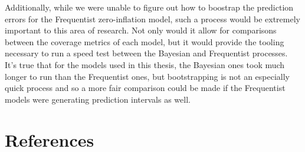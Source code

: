 \documentclass[12pt,twoside]{reedthesis}
\begin{document}
Additionally, while we were unable to figure out how to boostrap the prediction errors for the Frequentist zero-inflation model, such a process would be extremely important to this area of research. Not only would it allow for comparisons between the coverage metrics of each model, but it would provide the tooling necessary to run a speed test between the Bayesian and Frequentist processes. It's true that for the models used in this thesis, the Bayesian ones took much longer to run than the Frequentist ones, but bootstrapping is not an especially quick process and so a more fair comparison could be made if the Frequentist models were generating prediction intervals as well.

\backmatter

\hypertarget{references}{%
\chapter*{References}\label{references}}


\noindent

\setlength{\parindent}{-0.20in}
\end{document}
